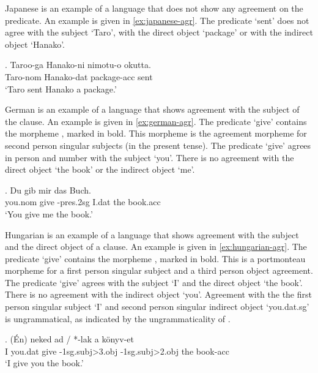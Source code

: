 Japanese is an example of a language that does not show any agreement on the predicate. An example is given in \ref{ex:japanese-agr}. The predicate  `sent' does not agree with the subject  `Taro', with the direct object  `package' or with the indirect object  `Hanako'.

\exg. Taroo-ga Hanako-ni nimotu-o okutta.\\
 Taro-\ac{nom} Hanako-\ac{dat} package-\ac{acc} sent\\
 `Taro sent Hanako a package.' \label{ex:japanese-agr}

German is an example of a language that shows agreement with the subject of the clause. An example is given in \ref{ex:german-agr}. The predicate  `give' contains the morpheme , marked in bold. This morpheme is the agreement morpheme for second person singular subjects (in the present tense). The predicate  `give' agrees in person and number with the subject  `you'. There is no agreement with the direct object  `the book' or the indirect object  `me'.

\exg. Du gib  mir {das Buch}.\\
 you.\ac{nom} give -\ac{pres}.2\ac{sg} I.\ac{dat} {the book.\ac{acc}}\\
 `You give me the book.' \label{ex:german-agr}

Hungarian is an example of a language that shows agreement with the subject and the direct object of a clause. An example is given in \ref{ex:hungarian-agr}. The predicate  `give' contains the morpheme , marked in bold. This is a portmonteau morpheme for a first person singular subject and a third person object agreement. The predicate  `give' agrees with the subject  `I' and the direct object  `the book'. There is no agreement with the indirect object  `you'. Agreement with the the first person singular subject  `I' and second person singular indirect object  `you.\ac{dat}.\ac{sg}' is ungrammatical, as indicated by the ungrammaticality of .

\exg. (Én) neked ad / *-lak a könyv-et\\
 I you.\ac{dat} give -1\ac{sg}.\ac{subj}>3.\ac{obj} -1\ac{sg}.\ac{subj}>2.\ac{obj} the book-\ac{acc}\\
 `I give you the book.' \label{ex:hungarian-agr}

